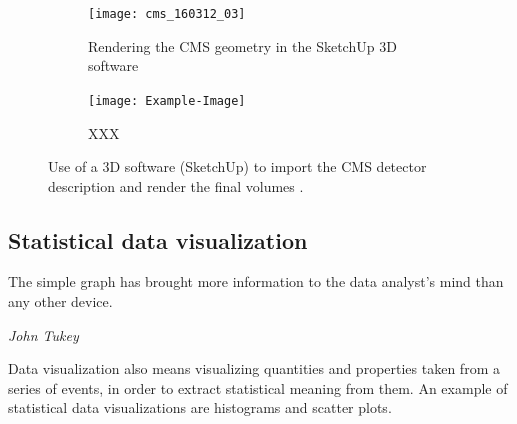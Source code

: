 \documentclass[12pt,a4paper]{article}
\begin{document}
\begin{figure}
	\centering
	\begin{subfigure}[b]{0.475\textwidth}
		\centering
		\texttt{[image: cms\_160312\_03]}
		\caption[CMS use of the SketchUp 3D software]%
		{{\small Rendering the CMS geometry in the SketchUp 3D software}}
		\label{fig:cms-sketchup-a}
	\end{subfigure}
	\quad
	\begin{subfigure}[b]{0.475\textwidth}
		\centering
		\texttt{[image: Example-Image]}
		\caption[XXX]{{\small XXX}}
		\label{fig:ed-sketchup-b}
	\end{subfigure}
	\caption[Using 3D editing software for HEP Geometry]
	{\small Use of a 3D software (SketchUp) to import the CMS detector description and render the final volumes \cite{CMSSketchUpImages}.}
	\label{fig:cms-sketchup}
\end{figure}



\hypertarget{statistical-data-visualization}{%
\subsection{Statistical data visualization}\label{statistical-data-visualization}}


\epigraph{The simple graph has brought more information to the data analyst's mind than any other device.}{\textit{John Tukey \cite{Tukey1962}}}

Data visualization also means visualizing quantities and properties taken from a series of events, in order to extract statistical
meaning from them. An example of statistical data visualizations are histograms and scatter plots.
\end{document}
